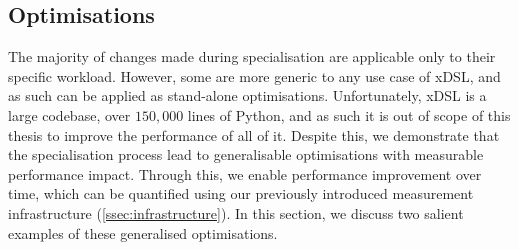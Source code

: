 


\subsection{Optimisations}
\label{sec:specialising-pattern-rewriting-optimisations}

The majority of changes made during specialisation are applicable only to their specific workload.
However, some are more generic to any use case of xDSL, and as such can be applied as stand-alone optimisations. Unfortunately, xDSL is a large codebase, over $150,000$ lines of Python, and as such it is out of scope of this thesis to improve the performance of all of it.
Despite this, we demonstrate that the specialisation process lead to generalisable optimisations with measurable performance impact.
Through this, we enable performance improvement over time, which can be quantified using our previously introduced measurement infrastructure (\autoref{ssec:infrastructure}).
In this section, we discuss two salient examples of these generalised optimisations.


